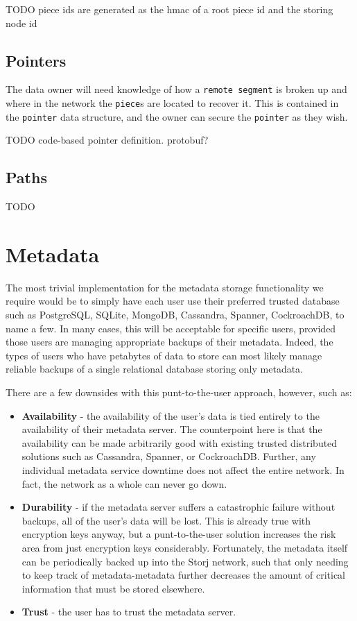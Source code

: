 \documentclass[11pt,fleqn,openany]{book}
\newcommand{\x}[1]{{\tt #1}} \newcommand{\code}[1]{{\tt #1}}
\newcommand{\todo}[1]{{\color{red} TODO #1 }}
\begin{document}
\todo{piece ids are generated as the hmac of a root piece id and the storing
node id}

\subsection{Pointers}

The data owner will need knowledge of how a \x{remote segment} is broken up and
where in the network the \x{piece}s are located to recover it. This is contained
in the \x{pointer} data structure, and the owner can secure the \x{pointer} as
they wish.

\todo{code-based pointer definition. protobuf?}

\subsection{Paths}

\todo{}

\section{Metadata}

The most trivial implementation for the metadata storage functionality we
require would be to simply have each user use their preferred trusted database
such as PostgreSQL, SQLite, MongoDB, Cassandra\cite{cassandra},
Spanner\cite{spanner}, CockroachDB, to name a few. In many cases, this will
be acceptable for specific users, provided those users are managing appropriate
backups of their metadata. Indeed, the types of users who have petabytes of data
to store can most likely manage reliable backups of a single relational database
storing only metadata.

There are a few downsides with this punt-to-the-user approach, however, such as:
\begin{itemize}
\item {\bf Availability} - the availability of the user's data
is tied entirely to the availability of their metadata server. The counterpoint
here is that the availability can be made arbitrarily good with existing trusted
distributed solutions such as Cassandra, Spanner, or CockroachDB. Further, any
individual metadata service downtime does not affect the entire network. In
fact, the network as a whole can never go down.
\item {\bf Durability} -
if the metadata server suffers a catastrophic failure without backups, all of
the user's data will be lost. This is already true with encryption keys anyway,
but a punt-to-the-user solution increases the risk area from just encryption
keys considerably. Fortunately, the metadata itself can be periodically backed
up into the Storj network,
such that only needing to keep track of metadata-metadata
further decreases the amount of critical information that must be stored
elsewhere.
\item {\bf Trust} - the user has to trust the metadata server.
\end{itemize}
\end{document}
